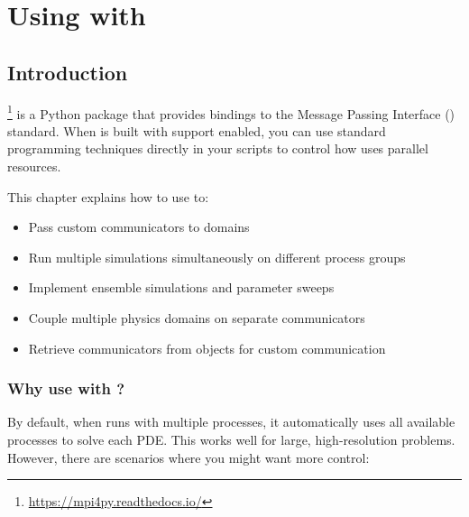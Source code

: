 
%
%

\chapter{Using \mpifo with \escript}
\label{CHAP:mpi4py}

\section{Introduction}

\mpifo\footnote{\url{https://mpi4py.readthedocs.io/}} is a Python package that provides bindings to the Message Passing Interface (\MPI) standard.
When \escript is built with \mpifo support enabled, you can use standard \MPI programming techniques directly in your \PYTHON scripts to control how \escript uses parallel resources.

This chapter explains how to use \mpifo to:
\begin{itemize}
\item Pass custom \MPI communicators to \escript domains
\item Run multiple simulations simultaneously on different process groups
\item Implement ensemble simulations and parameter sweeps
\item Couple multiple physics domains on separate communicators
\item Retrieve \MPI communicators from \escript objects for custom communication
\end{itemize}

\subsection{Why use \mpifo with \escript?}

By default, when \escript runs with multiple \MPI processes, it automatically uses all available processes to solve each PDE.
This works well for large, high-resolution problems.
However, there are scenarios where you might want more control:

